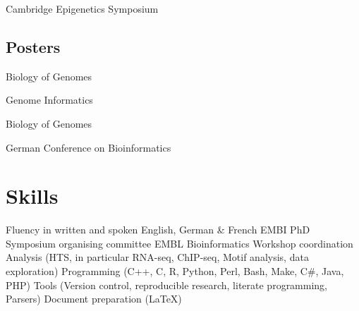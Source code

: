 \documentclass{klmr-cv}
\newcommand*\csharp{C\#}
\newcommand*\cpp{C++}
\begin{document}
\begin{itemize}
    \listitem
        \date{2014}
        Cambridge Epigenetics Symposium
\end{itemize}

\subsection{Posters}

\begin{itemize}
    \listitem
        \date{2015}
        Biology of Genomes
    \listitem
        \date{2014}
        Genome Informatics
    \listitem
        \date{2013}
        Biology of Genomes
    \listitem
        \date{2009}
        German Conference on Bioinformatics
\end{itemize}

\section{Skills}

\begin{itemize}
    \listitem Fluency in written and spoken English, German \& French
    \listitem EMBI PhD Symposium organising committee
    \listitem EMBL Bioinformatics Workshop coordination
    \listitem Analysis (HTS, in particular RNA-seq, ChIP-seq, Motif analysis,
        data exploration)
    \listitem Programming (\cpp, C, R, Python, Perl, Bash, Make, \csharp, Java, PHP)
    \listitem Tools (Version control, reproducible research, literate
        programming, Parsers)
    \listitem Document preparation (\LaTeX)
\end{itemize}
\end{document}
